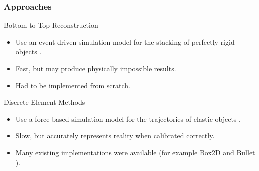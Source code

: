 \documentclass[sumlimits, intlimits]{beamer}
\begin{document}
\begin{frame}
\frametitle{Approaches}
\begin{block}{Bottom-to-Top Reconstruction}
\begin{itemize}
\item Use an event-driven simulation model
for the stacking of perfectly rigid objects \cite{poschel-2005}.
\item Fast, but may produce physically impossible results.
\item Had to be implemented from scratch.
\end{itemize}
\end{block}
\begin{block}{Discrete Element Methods}
\begin{itemize}
\item Use a force-based simulation model
for the trajectories of elastic objects \cite{poschel-2005}.
\item Slow, but accurately represents reality when calibrated correctly.
\item Many existing implementations were available
(for example Box2D \cite{box2d} and Bullet \cite{bullet}).
\end{itemize}
\end{block}
\end{frame}
\end{document}
